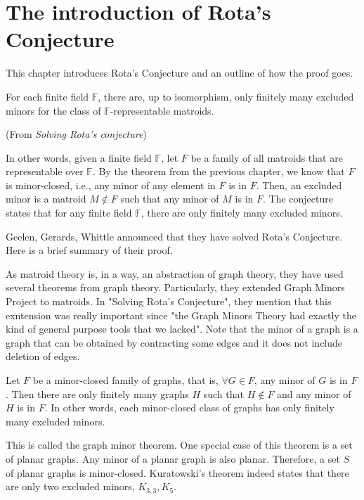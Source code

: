 \section{The introduction of Rota's Conjecture}
This chapter introduces Rota's Conjecture and an outline of how the proof goes.

\begin{conj}
For each finite field $\mathbb{F}$, there are, up to isomorphism, only finitely many excluded minors for the class of $\mathbb{F}$-representable matroids.
\end{conj}(From \textit{Solving Rota's conjecture})

In other words, given a finite field $\mathbb{F}$, let $F$ be a family of all matroids that are representable over $\mathbb{F}$.
By the theorem from the previous chapter, we know that $F$ is minor-closed, i.e., any minor of any element in $F$ is in $F$.
Then, an excluded minor is a matroid $M \notin F$ such that any minor of $M$ is in $F$.
The conjecture states that for any finite field $\mathbb{F}$, there are only finitely many excluded minors.

Geelen, Gerards, Whittle announced that they have solved Rota's Conjecture.
Here is a brief summary of their proof.

As matroid theory is, in a way, an abstraction of graph theory, they have used several theorems from graph theory.
Particularly, they extended Graph Minors Project to matroids.
In "Solving Rota's Conjecture", they mention that this exntension was really important since "the Graph Minors Theory had exactly the kind of general purpose tools that we lacked".
Note that the minor of a graph is a graph that can be obtained by contracting some edges and it does not include deletion of edges.

\begin{thm}
Let $F$ be a minor-closed family of graphs, that is, $\forall G \in F$, any minor of $G$ is in $F$.
Then there are only finitely many graphs $H$ such that $H \notin F$ and any minor of $H$ is in $F$.
In other words, each minor-closed class of graphs has only finitely many excluded minors.
\end{thm}

This is called the graph minor theorem.
One special case of this theorem is a set of planar graphs.
Any minor of a planar graph is also planar.
Therefore, a set $S$ of planar graphs is minor-closed.
Kuratowski's theorem indeed states that there are only two excluded minors, $K_{3, 3}, K_5$.

